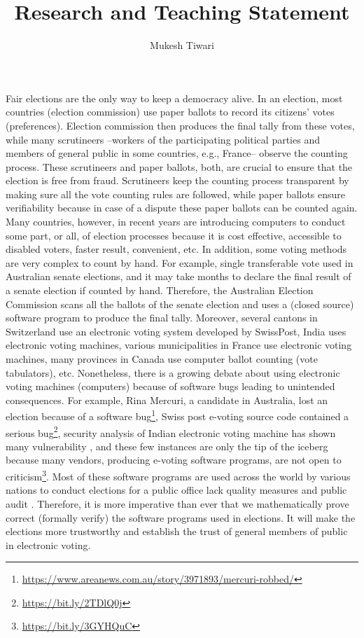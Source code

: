 \documentclass[a4paper]{article}
\title{Research and Teaching Statement}
\author{Mukesh Tiwari}
\date{}
\begin{document}
\fontsize{12}{15}
\selectfont
\maketitle



Fair elections are the only way to keep a democracy alive. In an election, most countries (election commission) use paper ballots to record 
its citizens' votes (preferences). Election commission then produces the final tally from these votes, 
while many scrutineers --workers of the participating political parties and members of general 
public in some countries, e.g., France-- observe the counting process. 
These scrutineers and paper ballots, both, are crucial to ensure that 
the election is free from fraud. Scrutineers keep the counting process transparent by making sure all the vote counting 
rules are followed, while paper ballots ensure verifiability because in case of a dispute these paper ballots 
can be counted again. Many countries, however, in recent years are introducing computers to conduct some part, or all, of 
election processes because it is cost effective, accessible to disabled voters, faster result, convenient, etc. 
In addition, some voting methods are very complex to count by hand. For example,
single transferable vote used in Australian senate elections, and it may take months to declare the final result of 
a senate election if 
counted by hand. Therefore, the Australian Election Commission scans all the ballots of the senate election and 
uses a (closed source) software program to produce the final tally. Moreover, several cantons in Switzerland use an electronic 
voting system developed by SwissPost, India uses electronic voting machines, various municipalities in France 
use electronic voting machines, many provinces in Canada use computer ballot counting (vote tabulators), 
etc.  Nonetheless, there is a growing debate about using electronic voting machines (computers)
because of software bugs leading to unintended consequences. For example, Rina Mercuri, 
a candidate in Australia, lost an election because of 
a software bug\footnote{\url{https://www.areanews.com.au/story/3971893/mercuri-robbed/}}, 
Swiss post e-voting source code contained a serious 
bug\footnote{\url{https://bit.ly/2TDlQ0j}}, security analysis of Indian electronic 
voting machine has shown many vulnerability \cite{Wolchok:2010:SAI:1866307.1866309}, and 
these few instances are only the tip of the iceberg because many vendors, producing 
e-voting software programs, are not open to criticism\footnote{\url{https://bit.ly/3GYHQuC}}.
Most of 
these software programs are used across the world by various nations to conduct elections for a public office 
lack quality measures and public audit \cite{10.1145/3014812.3014837, 9152765, AEC:2013:LMM}. 
Therefore, it is more imperative than ever  that  we mathematically prove correct (formally verify)  the software programs 
used in elections. It will make the elections more trustworthy and establish the trust of general members of public
in electronic voting.
\end{document}
